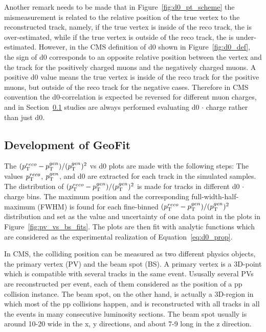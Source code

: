 Another remark needs to be made that in Figure~\ref{fig:d0_pt_scheme} the \pt mismeasurement is related to the relative position of the true vertex to the reconstructed track,
namely, if the true vertex is inside of the reco track, the \pt is over-estimated, 
while if the true vertex is outside of the reco track, the \pt is under-estimated. 
However, in the CMS definition of d0 shown in Figure~\ref{fig:d0_def}, the sign of d0 corresponds to an opposite relative position between the vertex and the track
for the positively charged muons and the negatively charged muons. 
A positive d0 value means the true vertex is inside of the reco track for the positive muons, but outside of the reco track for the negative cases.
Therefore in CMS convention the d0-\pt correlation is expected be reversed for different muon charges,
and in Section~\ref{sec:dev_geofit} studies are always performed evaluating d0 $\cdot$ charge rather than just d0.

\subsection{Development of GeoFit}\label{sec:dev_geofit}

The $(p_{\mathrm{T}}^{reco}-p_{\mathrm{T}}^{gen})/ (p_{\mathrm{T}}^{gen})^{2}$ vs d0 plots are made with the following steps:
The values $p_{\mathrm{T}}^{reco}$, $p_{\mathrm{T}}^{gen}$, and d0 are extracted for each track in the simulated samples.
The distribution of $(p_{\mathrm{T}}^{reco}-p_{\mathrm{T}}^{gen})/ (p_{\mathrm{T}}^{gen})^{2}$ is made for tracks in different d0 $\cdot$ charge bins.
The maximum position and the corresponding full-width-half-maximum (FWHM) is found for each 
fine-binned $(p_{\mathrm{T}}^{reco}-p_{\mathrm{T}}^{gen})/ (p_{\mathrm{T}}^{gen})^{2}$ distribution and set as the value and uncertainty
of one data point in the plots in Figure~\ref{fig:pv_vs_bs_fits}.
The plots are then fit with analytic functions which are considered as the experimental realization of Equation~\ref{eq:d0_prop}.

In CMS, the colliding position can be measured as two different physics objects, the primary vertex (PV) and the beam spot (BS).
A primary vertex is a 3D-point which is compatible with several tracks in the same event.
Ususally several PVs are reconstructed per event, each of them considered as the position of a pp collision instance.
The beam spot, on the other hand, is actually a 3D-region in which most of the pp collisions happen,
and is reconstructed with all tracks in all the events in many consecutive luminosity sections.
The beam spot usually is around 10-20 \mum wide in the x, y directions, and about 7-9 \cm long in the z direction.

